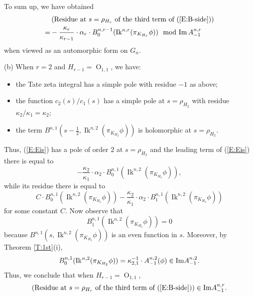 \documentclass[10pt]{amsart}
\theoremstyle{plain}
\numberwithin{equation}{section}
\begin{document}
To sum up, we have obtained
\begin{align}\label{E:B-side-fin2}
&\left(\text{Residue at $s=\rho_{H_r}$ of the third term of
  (\ref{E:B-side})}\right)\\
=&- \frac{\kappa_r}{\kappa_{r-1}} \cdot \alpha_r \cdot
 B_0^{n,r-1}({\operatorname{Ik}}^{n,r}(\pi_{K_{H_r}}\phi)) \mod{{\operatorname{Im\,}} A_{-1}^{n,r}}\notag
\end{align}
when viewed as an automorphic form on $G_n$.
\vskip 15pt

\noindent (b) When $r=2$ and $H_{r-1}  ={\operatorname{O}}_{1,1}$, we have:
\vskip 5pt
\begin{itemize}
\item the Tate zeta integral has a simple pole with residue $-1$  as above;
\item the function $c_2(s)/c_1(s)$ has a simple pole at $s = \rho_{H_2}$ with residue $\kappa_2/\kappa_1 = \kappa_2$;
\item the term $B^{n, 1}(s -\frac{1}{2}, {\operatorname{Ik}}^{n,2}(\pi_{K_{H_2}} \phi))$ is holomorphic at $s= \rho_{H_2}$.
\end{itemize}
\vskip 5pt

Thus,  (\ref{E:Eis}) has a pole of order $2$ at $s = \rho_{H_2}$ and the leading term of (\ref{E:Eis}) there is equal to 
\[  - \frac{\kappa_2}{\kappa_1} \cdot \alpha_2 \cdot B^{n,1}_0({\operatorname{Ik}}^{n,2}(\pi_{K_{H_2}}\phi)), \]
while its residue there is equal to
\[   C \cdot B_0^{n,1}({\operatorname{Ik}}^{n,2}(\pi_{K_{H_2}}\phi))   - \frac{\kappa_2}{\kappa_1} \cdot \alpha_2 \cdot 
B^{n,1}_1({\operatorname{Ik}}^{n,2}(\pi_{K_{H_2}}\phi))
\]
for some constant $C$. Now observe that 
\[ B^{n,1}_1({\operatorname{Ik}}^{n,2}(\pi_{K_{H_2}}\phi)) = 0 \]
because $B^{n,1}(s,{\operatorname{Ik}}^{n,2}(\pi_{K_{H_2}}\phi))$ is an even function in $s$. Moreover, 
by Theorem \ref{T:1st}(i), 
\[  B_0^{n,1}({\operatorname{Ik}}^{n,2}(\pi_{K_{H_2}}\phi))  = \kappa_{2,1}^{-1} \cdot A^{n,2}_{-1}(\phi) \in {\rm Im} A^{n,2}_{-1}. \]
Thus, we conclude that when $H_{r-1} = {\operatorname{O}}_{1,1}$,
  \begin{equation} \label{E:B-side-fin3}
   \left(\text{Residue at $s=\rho_{H_r}$ of the third term of
  (\ref{E:B-side})}\right) \in {\rm Im} A^{n,r}_{-1}. \end{equation}
\vskip 10pt
\end{document}
